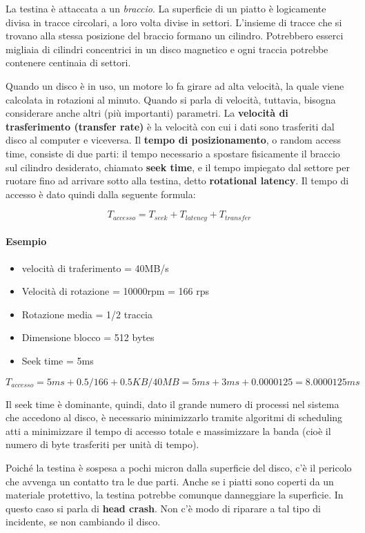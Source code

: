 \documentclass[a4]{article}
\begin{document}
La testina è attaccata a un \textit{braccio}. La superficie di un piatto è logicamente divisa in tracce circolari, a loro volta divise in settori. L'insieme di tracce che si trovano alla stessa posizione del braccio formano un cilindro. Potrebbero esserci migliaia di cilindri concentrici in un disco magnetico e ogni traccia potrebbe contenere centinaia di settori.

Quando un disco è in uso, un motore lo fa girare ad alta velocità, la quale viene calcolata in rotazioni al minuto. Quando si parla di velocità, tuttavia, bisogna considerare anche altri (più importanti) parametri. La \textbf{velocità di trasferimento (transfer rate)} è la velocità con cui i dati sono trasferiti dal disco al computer e viceversa. Il \textbf{tempo di posizionamento}, o random access time, consiste di due parti: il tempo necessario a spostare fisicamente il braccio sul cilindro desiderato, chiamato \textbf{seek time}, e il tempo impiegato dal settore per ruotare fino ad arrivare sotto alla testina, detto \textbf{rotational latency}.
Il tempo di accesso è dato quindi dalla seguente formula:

$$ T_{accesso} = T_{seek} + T_{latency} + T_{transfer} $$

\paragraph{Esempio}
\begin{itemize}
    \item velocità di traferimento = 40MB/s
    \item Velocità di rotazione = 10000rpm = 166 rps
    \item Rotazione media = 1/2 traccia
    \item Dimensione blocco = 512 bytes
    \item Seek time = 5ms
\end{itemize}

$$ T_{accesso} = 5 ms + 0.5/166 + 0.5 KB/40 MB = 5 ms + 3 ms + 0.0000125 = 8.0000125 ms $$

Il seek time è dominante, quindi, dato il grande numero di processi nel sistema che accedono al disco, è necessario minimizzarlo tramite algoritmi di scheduling atti a minimizzare il tempo di accesso totale e massimizzare la banda (cioè il numero di byte trasferiti per unità di tempo).

Poiché la testina è sospesa a pochi micron dalla superficie del disco, c'è il pericolo che avvenga un contatto tra le due parti. Anche se i piatti sono coperti da un materiale protettivo, la testina potrebbe comunque danneggiare la superficie. In questo caso si parla di \textbf{head crash}. Non c'è modo di riparare a tal tipo di incidente, se non cambiando il disco.
\end{document}
